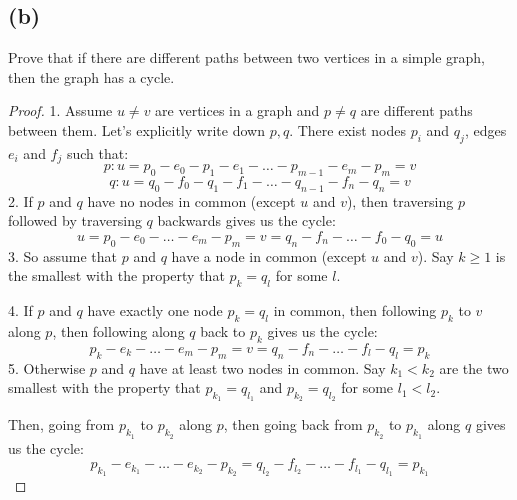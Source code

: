 \documentclass[14pt]{extarticle}
\begin{document}
\subsection{(b)}
Prove that if there are different paths between two vertices in a simple graph, then the graph has a cycle.
\begin{proof}
1. Assume $u \neq v$ are vertices in a graph and $p \neq q$ are different paths between them. Let's explicitly write down $p, q$. There exist nodes $p_i$ and $q_j$, edges $e_i$ and $f_j$ such that:
$$
p: u = p_0 - e_0 - p_1 - e_1 - \ldots - p_{m-1} - e_m - p_m = v
$$
$$
q: u = q_0 - f_0 - q_1 - f_1 - \ldots - q_{n-1} - f_n - q_n = v
$$
2. If $p$ and $q$ have no nodes in common (except $u$ and $v$), then traversing $p$ followed by traversing $q$ backwards gives us the cycle:
$$
u = p_0 - e_0 - \ldots - e_m - p_m = v = q_n - f_n - \ldots - f_0 - q_0 = u
$$
3. So assume that $p$ and $q$ have a node in common (except $u$ and $v$). Say $k \geq 1$ is the smallest with the property that $p_k = q_l$ for some $l$.

4. If $p$ and $q$ have exactly one node $p_k = q_l$ in common, then following $p_k$ to $v$ along $p$, then following along $q$ back to $p_k$ gives us the cycle:
$$
p_k - e_k - \ldots - e_m - p_m = v = q_n - f_n - \ldots - f_l - q_l = p_k
$$
5. Otherwise $p$ and $q$ have at least two nodes in common. Say $k_1 < k_2$ are the two smallest with the property that $p_{k_1} = q_{l_1}$ and $p_{k_2} = q_{l_2}$ for some $l_1 < l_2$. 

Then, going from $p_{k_1}$ to $p_{k_2}$ along $p$, then going back from $p_{k_2}$ to $p_{k_1}$ along $q$ gives us the cycle:
$$
p_{k_1} - e_{k_1} - \ldots - e_{k_2} - p_{k_2} = q_{l_2} - f_{l_2} - \ldots - f_{l_1} - q_{l_1} = p_{k_1}
$$
\end{proof}
\end{document}

